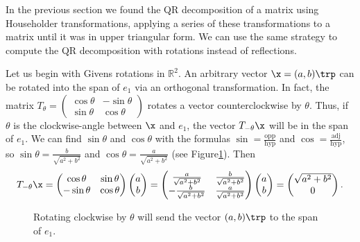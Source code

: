 In the previous section we found the QR decomposition of a matrix using Householder transformations, applying a series of these transformations to a matrix until it was in upper triangular form.
We can use the same strategy to compute the QR decomposition with rotations instead of reflections.

Let us begin with Givens rotations in $\mathbb{R}^2$.
An arbitrary vector $\x = (a, b)\trp$ can be rotated into the span of $e_1$ via an orthogonal transformation.
In fact, the matrix $T_{\theta} = \begin{pmatrix}\cos \theta & - \sin \theta \\ \sin \theta & \cos \theta \end{pmatrix}$ rotates a vector counterclockwise by $\theta$.
Thus, if $\theta$ is the clockwise-angle between $\x$ and $e_1$, the vector $T_{-\theta}\x$ will be in the span of $e_1$.
We can find $\sin \theta$ and $\cos \theta$ with the formulas $\sin = \frac{\text{opp}}{\text{hyp}}$ and $\cos = \frac{\text{adj}}{\text{hyp}}$, so $\sin \theta = \frac{b}{\sqrt{a^2+b^2}}$ and $\cos \theta =  \frac{a}{\sqrt{a^2+b^2}}$ (see Figure\ref{fig:angle}).
Then
\[
T_{-\theta}\x = \begin{pmatrix}\cos \theta &  \sin \theta \\ -\sin \theta & \cos \theta \end{pmatrix} \begin{pmatrix} a \\ b \end{pmatrix} = \begin{pmatrix}\frac{a}{\sqrt{a^2+b^2}} & \frac{b}{\sqrt{a^2+b^2}} \\ -\frac{b}{\sqrt{a^2+b^2}} & \frac{a}{\sqrt{a^2+b^2}} \end{pmatrix}\begin{pmatrix} a \\ b \end{pmatrix} = \begin{pmatrix} \sqrt{a^2+b^2} \\ 0 \end{pmatrix}.
\]

\begin{figure}
\begin{center}
\caption{Rotating clockwise by $\theta$ will send the vector $(a,b)\trp$ to the span of $e_1$.}
\label{fig:angle}
\end{center}
\end{figure}

